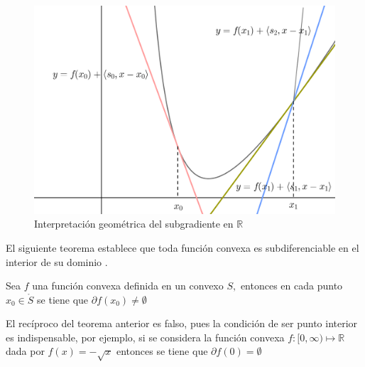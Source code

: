 \begin{figure}
   \centering
   \includegraphics{./partes/sub_sec/codigo-image/subgradiente.png}
   \caption{Interpretaci\'on geom\'etrica del subgradiente en $\mathbb{R}$ \cite{navarro}}
\end{figure}

El siguiente teorema establece que toda funci\'on convexa es subdiferenciable en el interior de su dominio \cite{navarro}.

{\teorema Sea $f$ una funci\'on convexa definida en un convexo $S,$ entonces en cada punto $x_0 \in \mathring{S}$ se tiene que
$\partial f(x_0) \neq \emptyset$ \label{convx-int}}
\medskip

El rec\'iproco del teorema anterior es falso, pues la condici\'on de ser punto interior es indispensable, por ejemplo, si se considera la
funci\'on convexa $f:[0, \infty ) \longmapsto \mathbb{R}$ dada por $f(x) = - \sqrt{x}$ entonces se tiene que $\partial f(0) = \emptyset$
\newpage







